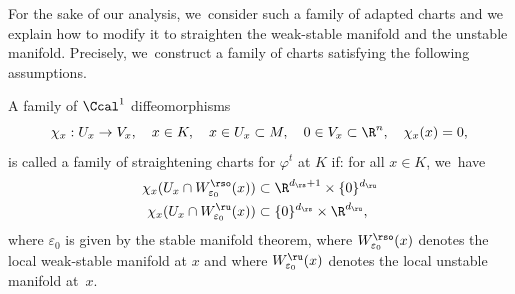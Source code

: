 \begin{appendix}
For the sake of our analysis, we~consider such a family of adapted charts and we explain how to modify it to straighten the weak-stable manifold and the unstable manifold. Precisely, we~construct a family of charts satisfying the following assumptions.

\begin{definition}\label{def: straightening charts}
A family of $\Ccal^{1}$ diffeomorphisms
\[
\chi_x: U_x \to V_x, \quad x \in K,\quad x \in U_x \subset M, \quad 0 \in V_x \subset \R^n, \quad \chi_x (x) = 0,
\]
is called a family of straightening charts for $\varphi^t$ at $K$ if: for all $x \in K$, we~have
\begin{align*}
\chi_x (U_x \cap W_{\varepsilon_0}^{\rso} (x)) &\subset \R^{d_\rs + 1} \times \{0\}^{d_\ru} \\
\chi_x (U_x \cap W_{\varepsilon_0}^{\ru} (x)) &\subset \{0\}^{d_\rs} \times \R^{d_\ru},
\end{align*}
where $\varepsilon_0$ is given by the stable manifold theorem, where $W_{\varepsilon_0}^{\rso} (x)$ denotes the local weak-stable manifold at $x$ and where $W_{\varepsilon_0}^{\ru} (x)$ denotes the local unstable manifold at~$x$.
\end{definition}


\end{appendix}
